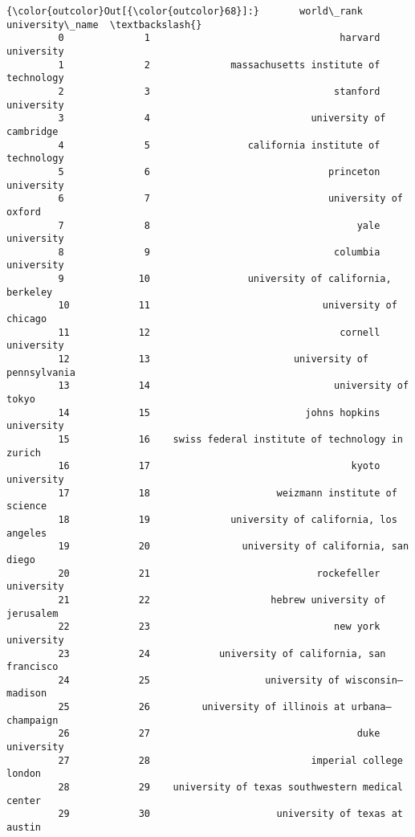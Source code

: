 \documentclass[11pt]{article}
\begin{document}
\begin{Verbatim}[commandchars=\\\{\}]
{\color{outcolor}Out[{\color{outcolor}68}]:}       world\_rank                                    university\_name  \textbackslash{}
         0              1                                 harvard university   
         1              2              massachusetts institute of technology   
         2              3                                stanford university   
         3              4                            university of cambridge   
         4              5                 california institute of technology   
         5              6                               princeton university   
         6              7                               university of oxford   
         7              8                                    yale university   
         8              9                                columbia university   
         9             10                 university of california, berkeley   
         10            11                              university of chicago   
         11            12                                 cornell university   
         12            13                         university of pennsylvania   
         13            14                                university of tokyo   
         14            15                           johns hopkins university   
         15            16    swiss federal institute of technology in zurich   
         16            17                                   kyoto university   
         17            18                      weizmann institute of science   
         18            19              university of california, los angeles   
         19            20                university of california, san diego   
         20            21                             rockefeller university   
         21            22                     hebrew university of jerusalem   
         22            23                                new york university   
         23            24            university of california, san francisco   
         24            25                    university of wisconsin–madison   
         25            26         university of illinois at urbana–champaign   
         26            27                                    duke university   
         27            28                            imperial college london   
         28            29    university of texas southwestern medical center   
         29            30                      university of texas at austin   

\end{Verbatim}
\end{document}
